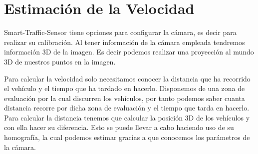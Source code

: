 \section{Estimación de la Velocidad}

Smart-Traffic-Sensor tiene opciones para configurar la cámara, es decir para realizar su calibración. Al tener información de la cámara empleada tendremos información 3D de la imagen. Es decir podemos realizar una proyección al mundo 3D de nuestros puntos en la imagen.

Para calcular la velocidad solo necesitamos conocer la distancia que ha recorrido el vehículo y el tiempo que ha tardado en hacerlo. Disponemos de una zona de evaluación por la cual discurren los vehículos, por tanto podemos saber cuanta distancia recorre por dicha zona de evaluación y el tiempo que tarda en hacerlo. Para calcular la distancia tenemos que calcular la posición 3D de los vehículos y con ella hacer su diferencia. Esto se puede llevar a cabo haciendo uso de su homografía, la cual podemos estimar gracias a que conocemos los parámetros de la cámara.




